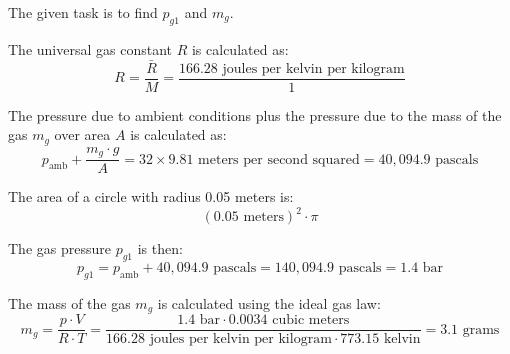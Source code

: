The given task is to find \( p_{g1} \) and \( m_g \).

The universal gas constant \( R \) is calculated as:
\[ R = \frac{\bar{R}}{M} = \frac{166.28 \text{ joules per kelvin per kilogram}}{1} \]

The pressure due to ambient conditions plus the pressure due to the mass of the gas \( m_g \) over area \( A \) is calculated as:
\[ p_{\text{amb}} + \frac{m_g \cdot g}{A} = 32 \times 9.81 \text{ meters per second squared} = 40,094.9 \text{ pascals} \]

The area of a circle with radius 0.05 meters is:
\[ (0.05 \text{ meters})^2 \cdot \pi \]

The gas pressure \( p_{g1} \) is then:
\[ p_{g1} = p_{\text{amb}} + 40,094.9 \text{ pascals} = 140,094.9 \text{ pascals} = 1.4 \text{ bar} \]

The mass of the gas \( m_g \) is calculated using the ideal gas law:
\[ m_g = \frac{p \cdot V}{R \cdot T} = \frac{1.4 \text{ bar} \cdot 0.0034 \text{ cubic meters}}{166.28 \text{ joules per kelvin per kilogram} \cdot 773.15 \text{ kelvin}} = 3.1 \text{ grams} \]